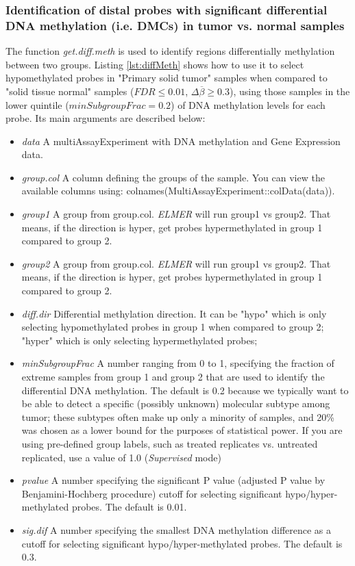 


\subsubsection*{Identification of distal probes with significant differential DNA methylation (i.e. DMCs) in tumor vs. normal samples}

The function \textit{get.diff.meth} is  used to identify regions differentially methylation between two groups.
Listing \ref{lst:diffMeth} shows how to use it to select hypomethylated probes in "Primary solid tumor" samples
when compared to "solid tissue normal" samples  ($FDR \leq 0.01$, $\Delta\overline{\beta}\geq 0.3$), using those samples
in the lower quintile ($minSubgroupFrac = 0.2$) of DNA methylation levels for each probe.
Its main arguments are described below:


\begin{itemize}
\item \textit{data} A multiAssayExperiment with DNA methylation and Gene Expression data.
\item  \textit{group.col}	A column defining the groups of the sample. You can view the available columns using: colnames(MultiAssayExperiment::colData(data)).
\item  \textit{group1}	A group from group.col. \textit{ELMER} will run group1 vs group2. That means, if the direction is hyper, get probes hypermethylated in group 1 compared to group 2.
\item  \textit{group2}	A group from group.col. \textit{ELMER} will run group1 vs group2. That means, if the direction is hyper, get probes hypermethylated in group 1 compared to group 2.
\item \textit{diff.dir} Differential methylation direction. It can be "hypo" which is only selecting hypomethylated probes in group 1 when compared to group 2; "hyper" which is only selecting hypermethylated probes;
\item  \textit{minSubgroupFrac} A number ranging from 0 to 1, specifying the fraction of extreme samples from group 1 and group 2 that are used to identify the differential DNA methylation. The default is 0.2 because we typically want to be able to detect a specific (possibly unknown) molecular subtype among tumor; these subtypes often make up only a minority of samples, and 20\% was chosen as a lower bound for the purposes of statistical power. If you are using pre-defined group labels, such as treated replicates vs. untreated replicated, use a value of 1.0 (\textit{Supervised} mode)

\item  \textit{pvalue} A number specifying the significant P value (adjusted P value by Benjamini-Hochberg procedure) cutoff for selecting significant hypo/hyper-methylated probes. The default is 0.01.
\item  \textit{sig.dif} A number specifying the smallest DNA methylation difference as a cutoff for selecting significant hypo/hyper-methylated probes. The default is 0.3.
\end{itemize}

